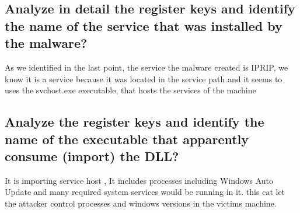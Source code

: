 \documentclass[12pt,letter]{article} %
\begin{document}
        \subsection{Analyze in detail the register keys and identify the name
        of the service that was installed by the malware?}

            As we identified in the last point, the service the
            malware created is IPRIP, we know it is a service because it was
            located in the service path and it seems to uses the svchost.exe
            executable, that hosts the services of the machine

        \subsection{Analyze the register keys and identify the name of the
        executable that apparently consume (import) the DLL?}
            It is importing service host ,  It includes processes including
            Windows Auto Update and many required system services would be
            running in it. this cat let the attacker control processes and
            windows versions in the victims machine.
\end{document}
